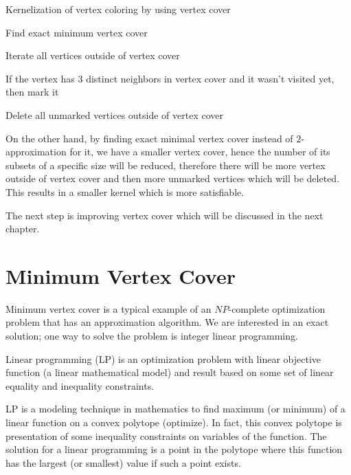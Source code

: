 \documentclass{beamer}
\begin{document}
{\begin{defi}
\vspace{1cm}

\begin{algorithm}[H]
\SetAlgoLined
\DontPrintSemicolon
  \caption{Kernelization of vertex coloring by using vertex cover}{\label{kern}}

Find exact minimum vertex cover\;

Iterate all vertices outside of vertex cover\;

If the vertex has $3$ distinct neighbors in vertex cover and it wasn't
visited yet, then mark it\;

Delete all unmarked vertices outside of vertex cover\;
\end{algorithm}

\vspace{1cm}

On the other hand, by finding exact minimal vertex cover instead of $2$-approximation for it, we have a smaller vertex cover, hence the number of its subsets of a specific size will be reduced, therefore there will be more vertex outside of vertex cover and then more unmarked vertices which will be deleted. This results in a smaller kernel which is more satisfiable.


The next step is improving vertex cover which will be discussed in the next chapter.






\newpage
\section{Minimum Vertex Cover}{\label{vertex_cover}}
Minimum vertex cover is a typical example of an $NP$-complete optimization problem that has an approximation algorithm. We are interested in an exact solution; one way to solve the problem is integer linear programming.

\begin{defi}
Linear programming (LP) is an optimization problem with linear objective function (a linear mathematical model) and result based on some set of linear equality and inequality constraints. 

LP is a modeling technique in mathematics to find maximum (or minimum) of a linear function on a convex polytope (optimize). In fact, this convex polytope is presentation of some inequality constraints on variables of the function. The solution for a linear programming is a point in the polytope where this function has the largest (or smallest) value if such a point exists.


\end{defi}
\end{defi}}
\end{document}
